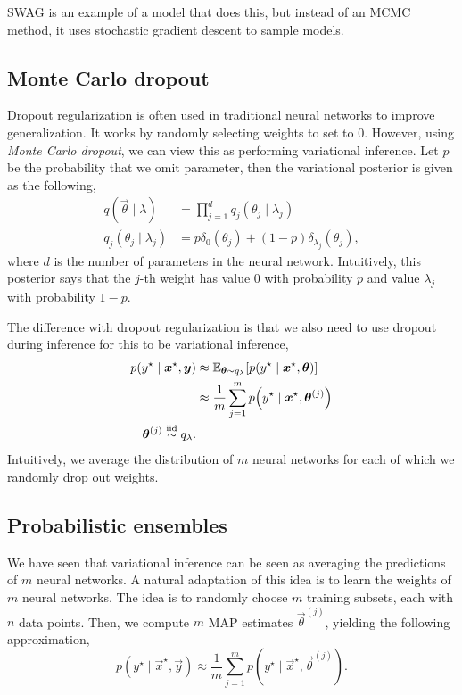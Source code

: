 SWAG \citep{maddox2019simple} is an example of a model that does this, but
instead of an MCMC method, it uses stochastic gradient descent to sample
models.

\subsection{Monte Carlo dropout}

Dropout regularization is often used in traditional neural networks to improve
generalization. It works by randomly selecting weights to set to 0. However,
using \textit{Monte Carlo dropout}, we can view this as performing variational
inference. Let $p$ be the probability that we omit parameter, then the
variational posterior is given as the following,
\begin{align*}
    q(\vec{\theta}\mid \lambda)  & = \prod_{j=1}^d q_j(\theta_j\mid \lambda_j)                  \\
    q_j(\theta_j \mid \lambda_j) & = p \delta_0(\theta_j) + (1-p) \delta_{\lambda_j}(\theta_j),
\end{align*}
where $d$ is the number of parameters in the neural network. Intuitively, this
posterior says that the $j$-th weight has value $0$ with probability $p$ and
value $\lambda_j$ with probability $1-p$.

The difference with dropout regularization is that we also need to use dropout
during inference for this to be variational inference,
\begin{align*}
    p(y^\star \mid \vec{x}^\star, \vec{y}) & \approx \E_{\vec{\theta}\sim q_{\lambda}}[p(y^\star \mid \vec{x}^\star, \vec{\theta})]        \\
                                           & \approx \frac{1}{m} \sum_{j=1}^m p \lft( y^\star \mid \vec{x}^\star, \vec{\theta}^{(j)} \rgt) \\
    \vec{\theta}^{(j)} \sampleiid q_{\lambda}.
\end{align*}
Intuitively, we average the distribution of $m$ neural networks for each of
which we randomly drop out weights.

\subsection{Probabilistic ensembles}

We have seen that variational inference can be seen as averaging the
predictions of $m$ neural networks. A natural adaptation of this idea is to
learn the weights of $m$ neural networks. The idea is to randomly choose $m$
training subsets, each with $n$ data points. Then, we compute $m$ MAP estimates
$\vec{\theta}^{(j)}$, yielding the following approximation, \[
    p(y^\star\mid\vec{x}^\star,\vec{y}) \approx \frac{1}{m} \sum_{j=1}^m p(y^\star\mid\vec{x}^\star,\vec{\theta}^{(j)}).
\]

